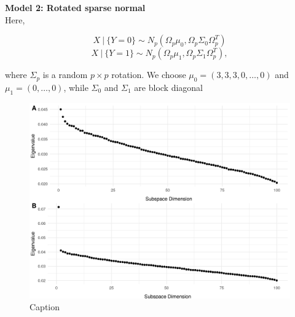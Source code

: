 \documentclass[12pt]{article}
\begin{document}


\noindent\textbf{Model 2: Rotated sparse normal}\\
Here,

\[X \ | \ \{Y = 0\} \sim N_p(\Omega_p\mu_0, \Omega_p \Sigma_0 \Omega_p^T)  \] 
\[X \ | \ \{Y = 1\} \sim N_p(\Omega_p\mu_1, \Omega_p\Sigma_1\Omega_p^T),  \]

where $\Sigma_p$ is a random $p\times p$ rotation. We choose $\mu_0 = (3, 3, 3, 0, \ldots, 0)$ and $\mu_1 = (0, \ldots, 0)$, while $\Sigma_0$ and $\Sigma_1$ are block diagonal


\begin{figure}
    \centering
    \includegraphics[width=6in]{../results/figures/sim_evs.png}
    \caption{Caption}
    \label{fig:sim_evs}
\end{figure}
\end{document}
